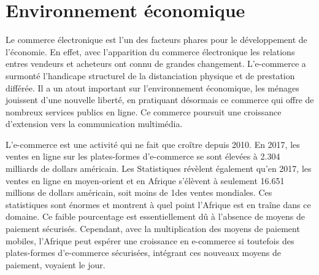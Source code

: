 \section{Environnement économique}

 Le commerce électronique est l'un des facteurs phares pour le développement de l'économie. En effet, avec l'apparition du commerce électronique les relations entres vendeurs et acheteurs ont connu de grandes changement. L'e-commerce a surmonté l'handicape structurel de la distanciation physique et de prestation différée.
 Il a un atout important sur l'environnement économique, les ménages jouissent d'une nouvelle liberté, en pratiquant désormais ce commerce qui offre de nombreux services publics en ligne. Ce commerce poursuit une croissance d'extension vers la communication multimédia.
 
 L'e-commerce est une activité qui ne fait que croître depuis 2010. En 2017,
 les ventes en ligne sur les plates-formes d'e-commerce se sont élevées à
 2.304 milliards de dollars américain.
 Les Statistiques révèlent également qu'en 2017, les ventes en ligne en moyen-orient et en Afrique s'élèvent à seulement 16.651 millions de dollars américain, soit moins de 1\textdiscount des ventes mondiales. Ces statistiques sont énormes et montrent à quel point l'Afrique est en traîne dans ce domaine. Ce faible pourcentage est essentiellement dû à l'absence de moyens de paiement sécurisés. Cependant, avec la multiplication des moyens de paiement mobiles, l'Afrique peut espérer une croissance en e-commerce si toutefois des plates-formes d'e-commerce sécurisées, intégrant ces nouveaux moyens de paiement, voyaient le jour.
 
 
 
 
 
 